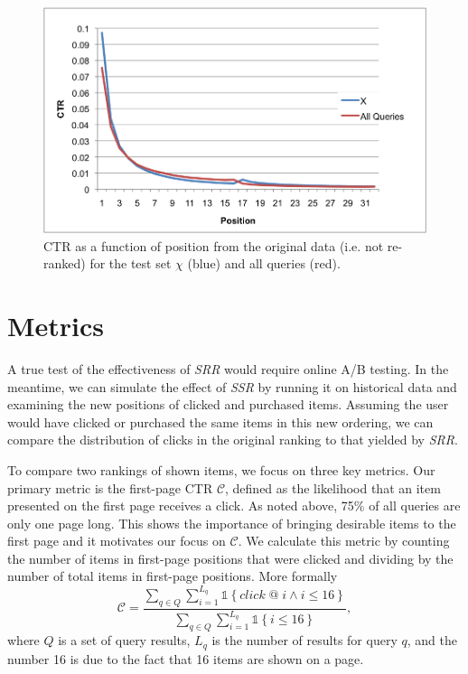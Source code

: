 \documentclass{article}
\begin{document}
\begin{figure}[htbp!]
    \centering
    \includegraphics[width=\textwidth]{CTRcompare.png}
    \caption{CTR as a function of position from the original data (i.e. not re-ranked) for the test set $\chi$ (blue) and all queries (red).}
    \label{fig:ctr_vs_position}
\end{figure}

\section{Metrics}

A true test of the effectiveness of {\em SRR} would require online A/B
testing. In the meantime, we can simulate the effect of {\em SSR} by running it
on historical data and examining the new positions of clicked and purchased items.
Assuming the user would have clicked or purchased the same items in this new ordering, 
we can compare the distribution of clicks in the original ranking to that yielded 
by {\em SRR}.

To compare two rankings of shown items, we focus on three key metrics. Our primary 
metric is the first-page CTR $\mathscr{C}$, defined as the likelihood that an item 
presented on the first page receives a click. As noted above, 75\% of all queries 
are only one page long. This shows the importance of bringing desirable items to the 
first page and it motivates our focus on $\mathscr{C}$. We calculate this metric by 
counting the number of items in first-page positions that were clicked and dividing 
by the number of total items in first-page positions. More formally
\begin{equation*}
    \mathscr{C} = \frac{\sum_{q \in Q}\sum_{i=1}^{L_q}\mathds{1}\left\{click\; @\; i \wedge i \leq 16\right\}}{\sum_{q \in Q}\sum_{i=1}^{L_q}\mathds{1}\left\{i \leq 16\right\}},
\end{equation*}
where $Q$ is a set of query results, $L_q$ is the number of results for query $q$, and
the number 16 is due to the fact that 16 items are shown on a page.
\end{document}
